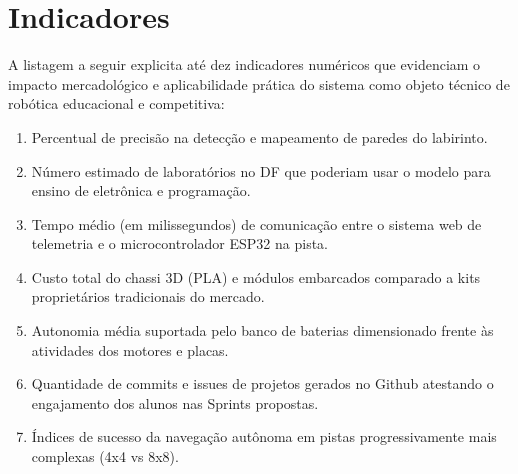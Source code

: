 \section{Indicadores}

A listagem a seguir explicita até dez indicadores numéricos que evidenciam o impacto mercadológico e aplicabilidade prática do sistema como objeto técnico de robótica educacional e competitiva:

\begin{enumerate}
    \item Percentual de precisão na detecção e mapeamento de paredes do labirinto.
    \item Número estimado de laboratórios no DF que poderiam usar o modelo para ensino de eletrônica e programação.
    \item Tempo médio (em milissegundos) de comunicação entre o sistema web de telemetria e o microcontrolador ESP32 na pista.
    \item Custo total do chassi 3D (PLA) e módulos embarcados comparado a kits proprietários tradicionais do mercado.
    \item Autonomia média suportada pelo banco de baterias dimensionado frente às atividades dos motores e placas.
    \item Quantidade de commits e issues de projetos gerados no Github atestando o engajamento dos alunos nas Sprints propostas.
    \item Índices de sucesso da navegação autônoma em pistas progressivamente mais complexas (4x4 vs 8x8).
\end{enumerate}